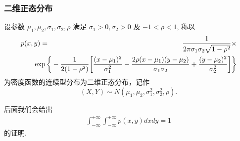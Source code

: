 \begin{frame}
	\frametitle{二维正态分布}
	\begin{defi}
		设参数 $\mu_1,\mu_2,\sigma_1,\sigma_2, \rho$ 满足 $\sigma_1>0,\sigma_2>0$ 及 $-1<\rho<1$, 称以
		\begin{eqnarray*}
			p(x,y)&=&\dfrac{1}{2\pi \sigma_1\sigma_2\sqrt{1-\rho^2}}\times\\
			&&\hspace{-1cm}\exp\bigg\{-\dfrac{1}{2(1-\rho^2)}\bigg[\dfrac{(x-\mu_1)^2}{\sigma_1^2}-\dfrac{2\rho(x-\mu_1)(y-\mu_2)}{\sigma_1\sigma_2}+\dfrac{(y-\mu_2)^2}{\sigma_2^2}\bigg]\bigg\}
		\end{eqnarray*}
		为密度函数的连续型分布为二维正态分布，记作 $$(X,Y)\sim N (\mu_1,\mu_2,\sigma_1^2,\sigma_2^2,\rho).$$
	\end{defi}

	\pause 后面我们会给出
	\begin{eqnarray*}
		\int_{-\infty}^{+\infty}  \int_{-\infty}^{+\infty}p(x,y)dxdy=1
	\end{eqnarray*}
	的证明.
\end{frame}

